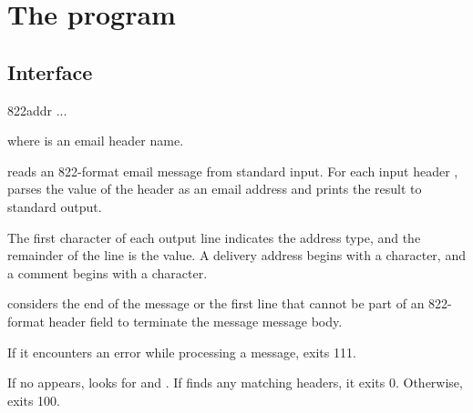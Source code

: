 
\chapter{The  program}

\section{Interface}
\begin{code}
  822addr  ...
\end{code}
where  is an email header name.

 reads an 822-format email message from standard input.
For each input header ,  parses
the value of the header as an email address and prints the result to
standard output.

The first character of each output line indicates the address type,
and the remainder of the line is the value.  A delivery address
begins with a \cmd{+} character, and a comment begins with a \cmd{(} character.

 considers the end of the message or the first line that
cannot be part of an 822-format header field to terminate the message
message body.

If it encounters an error while processing a message,
 exits 111.

If no  appears,  looks for  and .
If  finds any matching headers, it exits 0.
Otherwise,  exits 100.

